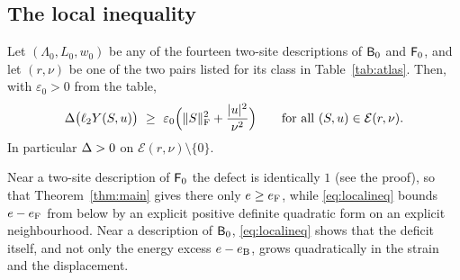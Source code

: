 \subsection{The local inequality}

\begin{theorem}\label{thm:local}
Let $(\Lambda_0,L_0,w_0)$ be any of the fourteen two-site descriptions of $\mathsf B_0$ and $\mathsf F_0$, and let $(r,\nu)$ be one of the two pairs
listed for its class in Table~\ref{tab:atlas}. Then, with $\varepsilon_0>0$ from the table,
\begin{equation}\label{eq:localineq}
  \Def\bigl(\ltwo Y(S,u)\bigr)\ \ge\ \varepsilon_0\Bigl(\|S\|_\Fro^2+\frac{|u|^2}{\nu^2}\Bigr)\qquad\text{for all }(S,u)\in\mathcal E(r,\nu).
\end{equation}
In particular $\Delta>0$ on $\mathcal E(r,\nu)\setminus\{0\}$.
\end{theorem}

Near a two-site description of $\mathsf F_0$ the defect is identically $1$ (see the proof), so that Theorem~\ref{thm:main} gives there
only $e\ge e_{\mathrm F}$, while \eqref{eq:localineq} bounds $e-e_{\mathrm F}$ from below by an explicit positive definite quadratic form on an explicit
neighbourhood. Near a description of $\mathsf B_0$, \eqref{eq:localineq} shows that the deficit itself, and not only the energy excess
$e-e_{\mathrm B}$, grows quadratically in the strain and the displacement.

